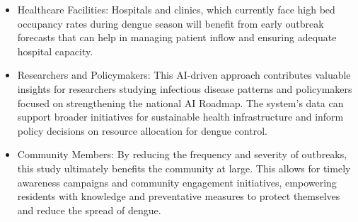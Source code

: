 \begin{itemize} 
	\item Healthcare Facilities: Hospitals and clinics, which currently face high bed occupancy rates during dengue season will benefit from early outbreak forecasts that can help in managing patient inflow and ensuring adequate hospital capacity. 
\end{itemize}


\begin{itemize} 
	\item Researchers and Policymakers: This AI-driven approach contributes valuable insights for researchers studying infectious disease patterns and policymakers focused on strengthening the national AI Roadmap. The system's data can support broader initiatives for sustainable health infrastructure and inform policy decisions on resource allocation for dengue control.
\end{itemize}


\begin{itemize} 
	\item Community Members: By reducing the frequency and severity of outbreaks, this study ultimately benefits the community at large. This allows for timely awareness campaigns and community engagement initiatives, empowering residents with knowledge and preventative measures to protect themselves and reduce the spread of dengue.
\end{itemize}


